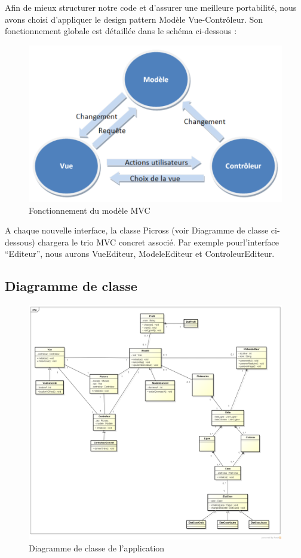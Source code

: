 \documentclass[a4paper, 12pt, twoside]{article}
\begin{document}
Afin de mieux structurer notre code et d’assurer une meilleure portabilité, nous avons choisi d’appliquer le design pattern Modèle Vue-Contrôleur. Son fonctionnement globale est détaillée dans le schéma ci-dessous :
\medbreak
\begin{figure}[H]
  \center
  \includegraphics[scale=0.5]{mvc.png}
  \caption{Fonctionnement du modèle MVC}
  \label{MVC}
\end{figure}
\medbreak
A chaque nouvelle interface, la classe Picross (voir Diagramme de classe ci-dessous) chargera le trio MVC concret associé. Par exemple pourl’interface “Editeur”, nous aurons VueEditeur, ModeleEditeur et ControleurEditeur.

\newpage
\subsection{Diagramme de classe}

\begin{figure}[H]
  \center
  \includegraphics[scale=0.3]{diagrammeClasse.png}
  \caption{Diagramme de classe de l'application}
  \label{diagClasse}
\end{figure}
\end{document}
